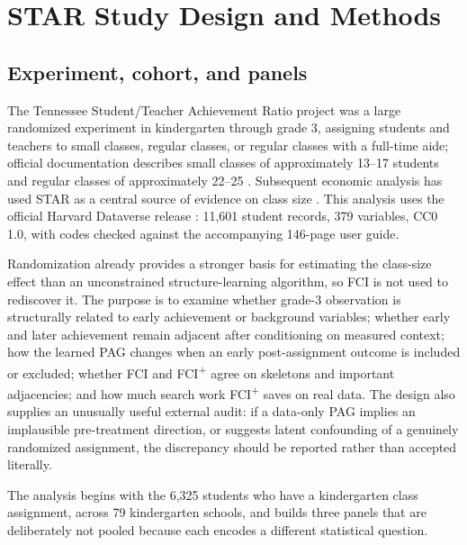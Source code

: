 \documentclass[11pt,a4paper]{article}
\newcommand{\FCIplus}{FCI\textsuperscript{+}}
\begin{document}
\section{STAR Study Design and Methods}
\label{sec:star-design}

\subsection{Experiment, cohort, and panels}

The Tennessee Student/Teacher Achievement Ratio project was a large randomized
experiment in kindergarten through grade 3, assigning students and teachers to
small classes, regular classes, or regular classes with a full-time aide;
official documentation describes small classes of approximately 13--17 students
and regular classes of approximately 22--25 \citep{word1990star}. Subsequent
economic analysis has used STAR as a central source of evidence on class size
\citep{krueger1999experimental}. This analysis uses the official Harvard
Dataverse release \citep{achilles2008star}: 11,601 student records, 379
variables, CC0 1.0, with codes checked against the accompanying 146-page user
guide.

Randomization already provides a stronger basis for estimating the class-size
effect than an unconstrained structure-learning algorithm, so FCI is not used to
rediscover it. The purpose is to examine whether grade-3 observation is
structurally related to early achievement or background variables; whether early
and later achievement remain adjacent after conditioning on measured context;
how the learned PAG changes when an early post-assignment outcome is included or
excluded; whether FCI and \FCIplus{} agree on skeletons and important
adjacencies; and how much search work \FCIplus{} saves on real data. The design
also supplies an unusually useful external audit: if a data-only PAG implies an
implausible pre-treatment direction, or suggests latent confounding of a
genuinely randomized assignment, the discrepancy should be reported rather than
accepted literally.

The analysis begins with the 6,325 students who have a kindergarten class
assignment, across 79 kindergarten schools, and builds three panels that are
deliberately not pooled because each encodes a different statistical question.
\end{document}
